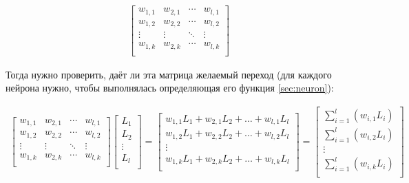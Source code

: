 \documentclass{article}
\begin{document}
        \begin{align}
            \begin{bmatrix}
                w_{1,1} & w_{2,1} & \cdots  & w_{l,1} \\
                w_{1,2} & w_{2,2} & \cdots  & w_{l,2} \\
                \vdots  & \vdots  & \ddots  & \vdots  \\
                w_{1,k} & w_{2,k} & \cdots  & w_{l,k} \\
            \end{bmatrix}
        \end{align}

        Тогда нужно проверить, даёт ли эта матрица желаемый переход
        (для каждого нейрона нужно, чтобы выполнялась
        определяющая его функция \ref{sec:neuron}):
        
        \begin{align}
            \begin{bmatrix}
                w_{1,1} & w_{2,1} & \cdots  & w_{l,1} \\
                w_{1,2} & w_{2,2} & \cdots  & w_{l,2} \\
                \vdots  & \vdots  & \ddots  & \vdots  \\
                w_{1,k} & w_{2,k} & \cdots  & w_{l,k} \\
            \end{bmatrix}
            \begin{bmatrix}
                L_1    \\
                L_2    \\
                \vdots \\
                L_l    \\
            \end{bmatrix} =
            \begin{bmatrix}
                w_{1,1} L_1 + w_{2,1} L_2 + \ldots + w_{l,1} L_l\\
                w_{1,2} L_1 + w_{2,2} L_2 + \ldots + w_{l,2} L_l\\
                \vdots                                          \\
                w_{1,k} L_1 + w_{2,k} L_2 + \ldots + w_{l,k} L_l\\
            \end{bmatrix} =
            \begin{bmatrix}
                \sum_{i = 1}^{l}\left( w_{i,1} L_i \right)\\
                \sum_{i = 1}^{l}\left( w_{i,2} L_i \right)\\
                \vdots                                    \\
                \sum_{i = 1}^{l}\left( w_{i,k} L_i \right)\\
            \end{bmatrix}
        \end{align}
\end{document}
